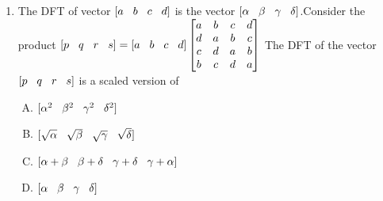 \documentclass[journal,12pt,twocolumn]{IEEEtran}
\begin{document}
\begin{enumerate}
\item The DFT of vector $[a\hspace{3mm}b\hspace{3mm}c\hspace{3mm}d]$ is the vector $[\alpha \hspace{3mm}\beta \hspace{3mm}\gamma \hspace{3mm} \delta]$.Consider the product \newline $[p\hspace{3mm}q\hspace{3mm}r\hspace{3mm}s]=[a\hspace{3mm}b\hspace{3mm}c\hspace{3mm}d] \begin{bmatrix}
a & b & c & d \\
d & a & b & c \\
c & d & a & b\\
b & c & d & a
\end{bmatrix}$ 
\newline The DFT of the vector $[p\hspace{3mm}q\hspace{3mm}r\hspace{3mm}s] $ is a scaled version of \\
\begin{enumerate}[(A)]

\setlength\itemsep{2em}

\item $[\alpha^{2} \hspace{3mm}\beta^{2} \hspace{3mm}\gamma^{2} \hspace{3mm} \delta^{2}]$
\item $[\sqrt{\alpha} \hspace{3mm}\sqrt{\beta} \hspace{3mm}\sqrt{\gamma} \hspace{3mm}\sqrt{ \delta}]$
\item $[\alpha + \beta \hspace{3mm}\beta + \delta \hspace{3mm}\gamma + \delta \hspace{3mm} \gamma + \alpha]$
\item $[\alpha \hspace{3mm}\beta \hspace{3mm}\gamma \hspace{3mm} \delta]$
\end{enumerate}


\end{enumerate}
\end{document}

